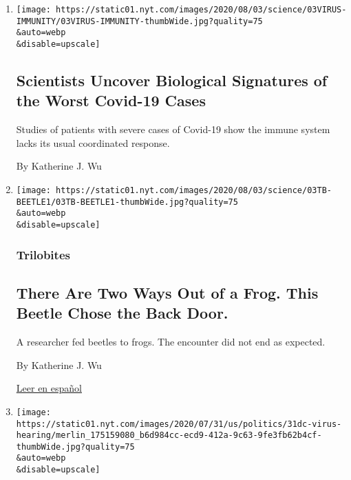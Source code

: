\begin{enumerate}
\def\labelenumi{\arabic{enumi}.}
\item
  \href{/2020/08/04/health/coronavirus-immune-system.html}{}

  \texttt{[image: https://static01.nyt.com/images/2020/08/03/science/03VIRUS-IMMUNITY/03VIRUS-IMMUNITY-thumbWide.jpg?quality=75\\\&auto=webp\\\&disable=upscale]}

  \hypertarget{scientists-uncover-biological-signatures-of-the-worst-covid-19-cases}{%
  \subsection{Scientists Uncover Biological Signatures of the Worst
  Covid-19
  Cases}\label{scientists-uncover-biological-signatures-of-the-worst-covid-19-cases}}

  Studies of patients with severe cases of Covid-19 show the immune
  system lacks its usual coordinated response.

  By Katherine J. Wu
\item
  \href{/2020/08/03/science/beetle-frog-poop.html}{}

  \texttt{[image: https://static01.nyt.com/images/2020/08/03/science/03TB-BEETLE1/03TB-BEETLE1-thumbWide.jpg?quality=75\\\&auto=webp\\\&disable=upscale]}

  \hypertarget{trilobites}{%
  \subsubsection{Trilobites}\label{trilobites}}

  \hypertarget{there-are-two-ways-out-of-a-frog-this-beetle-chose-the-back-door}{%
  \subsection{There Are Two Ways Out of a Frog. This Beetle Chose the
  Back
  Door.}\label{there-are-two-ways-out-of-a-frog-this-beetle-chose-the-back-door}}

  A researcher fed beetles to frogs. The encounter did not end as
  expected.

  By Katherine J. Wu

  \href{https://www.nytimes.com/es/2020/08/04/espanol/ciencia-y-tecnologia/escarabajo-excremento-rana.html}{Leer
  en español}
\item
  \href{/2020/07/31/us/politics/trump-coronavirus-testing.html}{}

  \texttt{[image: https://static01.nyt.com/images/2020/07/31/us/politics/31dc-virus-hearing/merlin\_175159080\_b6d984cc-ecd9-412a-9c63-9fe3fb62b4cf-thumbWide.jpg?quality=75\\\&auto=webp\\\&disable=upscale]}


\end{enumerate}
